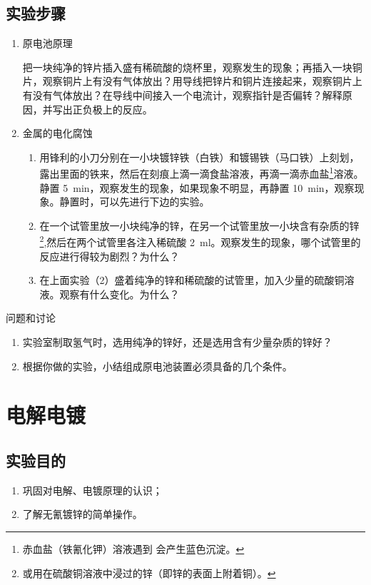 \subsection*{实验步骤}
\begin{enumerate}[1.]
  \item 原电池原理
  
  把一块纯净的锌片插入盛有稀硫酸的烧杯里，观察发生的现象；再插入一块铜片，观察铜片上有没有气体放出？用导线把锌片和铜片连接起来，观察铜片上有没有气体放出？在导线中间接入一个电流计，观察指针是否偏转？解释原因，并写出正负极上的反应。
  \item 金属的电化腐蚀
  \begin{enumerate}[(1)]
    \item 用锋利的小刀分别在一小块镀锌铁（白铁）和镀锡铁（马口铁）上刻划，露出里面的铁来，然后在刻痕上滴一滴食盐溶液，再滴一滴赤血盐\footnote{赤血盐（铁氰化钾）溶液遇到  会产生蓝色沉淀。}溶液。静置 \qty{5}{min}，观察发生的现象，如果现象不明显，再静置 \qty{10}{min}，观察现象。静置时，可以先进行下边的实验。
    \item 在一个试管里放一小块纯净的锌，在另一个试管里放一小块含有杂质的锌\footnote{或用在硫酸铜溶液中浸过的锌（即锌的表面上附着铜）。},然后在两个试管里各注入稀硫酸 \qty{2}{ml}。观察发生的现象，哪个试管里的反应进行得较为剧烈？为什么？
    \item 在上面实验（2）盛着纯净的锌和稀硫酸的试管里，加入少量的硫酸铜溶液。观察有什么变化。为什么？
  \end{enumerate}

\end{enumerate}
\begin{Theorem}{问题和讨论}
\begin{enumerate}[1.]
  \item 实验室制取氢气时，选用纯净的锌好，还是选用含有少量杂质的锌好？
  \item 根据你做的实验，小结组成原电池装置必须具备的几个条件。
\end{enumerate}
\end{Theorem}


\section{电解\texorpdfstring{\quad}{ }电镀}
\subsection*{实验目的}
\begin{enumerate}[1.]
  \item 巩固对电解、电镀原理的认识；
  \item 了解无氰镀锌的简单操作。
\end{enumerate}
